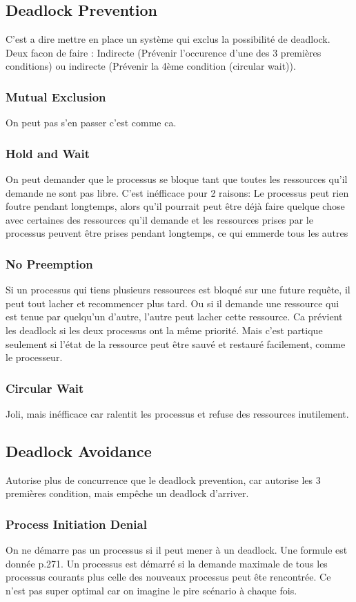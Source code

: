 \subsection{Deadlock Prevention}
C’est a dire mettre en place un système qui exclus la possibilité de deadlock. Deux facon de faire : Indirecte (Prévenir l’occurence d’une des 3 premières conditions) ou indirecte (Prévenir la 4ème condition (circular wait)).
\subsubsection{Mutual Exclusion}
On peut pas s’en passer c’est comme ca.
\subsubsection{Hold and Wait}
On peut demander que le processus se bloque tant que toutes les ressources qu’il demande ne sont pas libre. C’est inéfficace pour 2 raisons: Le processus peut rien foutre pendant longtemps, alors qu’il pourrait peut être déjà faire quelque chose avec certaines des ressources qu’il demande et les ressources prises par le processus peuvent être prises pendant longtemps, ce qui emmerde tous les autres
\subsubsection{No Preemption}
Si un processus qui tiens plusieurs ressources est bloqué sur une future requête, il peut tout lacher et recommencer plus tard. Ou si il demande une ressource qui est tenue par quelqu’un d’autre, l’autre peut lacher cette ressource. Ca prévient les deadlock si les deux processus ont la même priorité. Mais c’est partique seulement si l’état de la ressource peut être sauvé et restauré facilement, comme le processeur.
\subsubsection{Circular Wait}
Joli, mais inéfficace car ralentit les processus et refuse des ressources inutilement.
\subsection{Deadlock Avoidance}
Autorise plus de concurrence que le deadlock prevention, car autorise les 3 premières condition, mais empêche un deadlock d’arriver.
\subsubsection{Process Initiation Denial}
On ne démarre pas un processus si il peut mener à un deadlock. Une formule est donnée p.271. Un processus est démarré si la demande maximale de tous les processus courants plus celle des nouveaux processus peut ête rencontrée. Ce n’est pas super optimal car on imagine le pire scénario à chaque fois.
